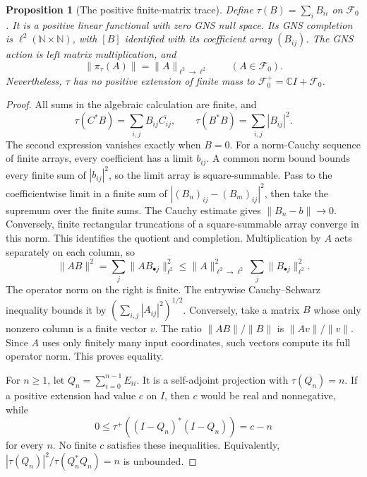 \documentclass[11pt]{article}
\newtheorem{proposition}[theorem]{Proposition}
\theoremstyle{definition}
\theoremstyle{remark}
\numberwithin{equation}{section}
\newcommand{\C}{\mathbb C}
\begin{document}
\begin{proposition}[The positive finite-matrix trace]
\label{prop:weil-matrix-trace}
Define $\tau(B)=\sum_i B_{ii}$ on $\mathscr F_0$.
It is a positive linear functional with zero GNS null space.
Its GNS completion is $\ell^2(\mathbb N\times\mathbb N)$, with $[B]$
identified with its coefficient array $(B_{ij})$.
The GNS action is left matrix multiplication, and
\[
 \|\pi_\tau(A)\|=\|A\|_{\ell^2\to\ell^2}
 \qquad(A\in\mathscr F_0).
\]
Nevertheless, $\tau$ has no positive extension of finite mass to
$\mathscr F_0^+=\C I+\mathscr F_0$.
\end{proposition}
\begin{proof}
All sums in the algebraic calculation are finite, and
\[
 \tau(C^*B)=\sum_{i,j}B_{ij}\overline{C_{ij}},\qquad
 \tau(B^*B)=\sum_{i,j}|B_{ij}|^2.
\]
The second expression vanishes exactly when $B=0$.
For a norm-Cauchy sequence of finite arrays, every coefficient has a
limit $b_{ij}$.  A common norm bound bounds every finite sum of
$|b_{ij}|^2$, so the limit array is square-summable.
Pass to the coefficientwise limit in a finite sum of
$|(B_n)_{ij}-(B_m)_{ij}|^2$, then take the supremum over the finite sums.
The Cauchy estimate gives $\|B_n-b\|\to0$.
Conversely, finite rectangular truncations of a square-summable array
converge in this norm.  This identifies the quotient and completion.
Multiplication by $A$ acts separately on each column, so
\[
 \|AB\|^2=\sum_j\|A B_{\bullet j}\|_{\ell^2}^2
       \leq\|A\|_{\ell^2\to\ell^2}^2\sum_j\|B_{\bullet j}\|_{\ell^2}^2.
\]
The operator norm on the right is finite.  The entrywise
Cauchy--Schwarz inequality bounds it by
$(\sum_{i,j}|A_{ij}|^2)^{1/2}$.
Conversely, take a matrix $B$ whose only nonzero column is a finite
vector $v$.  The ratio $\|AB\|/\|B\|$ is $\|Av\|/\|v\|$.
Since $A$ uses only finitely many input coordinates, such vectors
compute its full operator norm.  This proves equality.

For $n\geq1$, let $Q_n=\sum_{i=0}^{n-1}E_{ii}$.
It is a self-adjoint projection with $\tau(Q_n)=n$.
If a positive extension had value $c$ on $I$, then $c$ would be real
and nonnegative, while
\[
 0\leq\tau^+((I-Q_n)^*(I-Q_n))=c-n
\]
for every $n$.  No finite $c$ satisfies these inequalities.
Equivalently,
$|\tau(Q_n)|^2/\tau(Q_n^*Q_n)=n$ is unbounded.
\end{proof}
\end{document}
